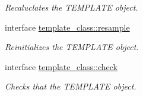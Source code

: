\begin{DoxyCompactItemize}
\begin{DoxyCompactList}\small\item\em Recaluclates the T\+E\+M\+P\+L\+A\+T\+E object. \end{DoxyCompactList}\item 
interface \hyperlink{interfacetemplate__class_1_1resample}{template\+\_\+class\+::resample}
\begin{DoxyCompactList}\small\item\em Reinitializes the T\+E\+M\+P\+L\+A\+T\+E object. \end{DoxyCompactList}\item 
interface \hyperlink{interfacetemplate__class_1_1check}{template\+\_\+class\+::check}
\begin{DoxyCompactList}\small\item\em Checks that the T\+E\+M\+P\+L\+A\+T\+E object. \end{DoxyCompactList}\end{DoxyCompactItemize}
